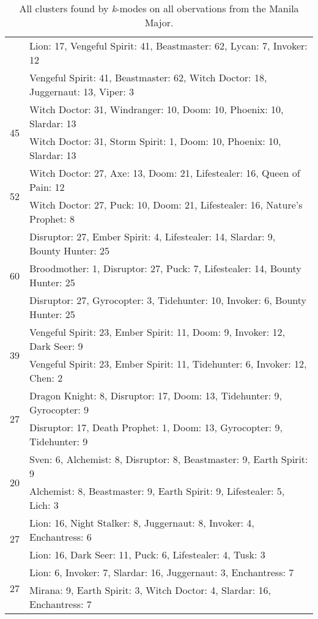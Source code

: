 \documentclass[result.tex]{subfiles}
\begin{document}
\begin{table}[H]
\begin{tabular}{ | c | p{12.5cm} | }
    & Lion: 17, Vengeful Spirit: 41, Beastmaster: 62, Lycan: 7, Invoker: 12 \\
    & Vengeful Spirit: 41, Beastmaster: 62, Witch Doctor: 18, Juggernaut: 13, Viper: 3 \\
    \hline
    \multirow{2}{*}{45}
    & Witch Doctor: 31, Windranger: 10, Doom: 10, Phoenix: 10, Slardar: 13 \\
    & Witch Doctor: 31, Storm Spirit: 1, Doom: 10, Phoenix: 10, Slardar: 13 \\
    \hline
    \multirow{2}{*}{52}
    & Witch Doctor: 27, Axe: 13, Doom: 21, Lifestealer: 16, Queen of Pain: 12 \\
    & Witch Doctor: 27, Puck: 10, Doom: 21, Lifestealer: 16, Nature's Prophet: 8 \\
    \hline
    \multirow{3}{*}{60}
    & Disruptor: 27, Ember Spirit: 4, Lifestealer: 14, Slardar: 9, Bounty Hunter: 25 \\
    & Broodmother: 1, Disruptor: 27, Puck: 7, Lifestealer: 14, Bounty Hunter: 25 \\
    & Disruptor: 27, Gyrocopter: 3, Tidehunter: 10, Invoker: 6, Bounty Hunter: 25 \\
    \hline
    \multirow{2}{*}{39}
    & Vengeful Spirit: 23, Ember Spirit: 11, Doom: 9, Invoker: 12, Dark Seer: 9 \\
    & Vengeful Spirit: 23, Ember Spirit: 11, Tidehunter: 6, Invoker: 12, Chen: 2 \\
    \hline
    \multirow{2}{*}{27}
    & Dragon Knight: 8, Disruptor: 17, Doom: 13, Tidehunter: 9, Gyrocopter: 9 \\
    & Disruptor: 17, Death Prophet: 1, Doom: 13, Gyrocopter: 9, Tidehunter: 9 \\
    \hline
    \multirow{2}{*}{20}
    & Sven: 6, Alchemist: 8, Disruptor: 8, Beastmaster: 9, Earth Spirit: 9 \\
    & Alchemist: 8, Beastmaster: 9, Earth Spirit: 9, Lifestealer: 5, Lich: 3 \\
    \hline
    \multirow{2}{*}{27}
    & Lion: 16, Night Stalker: 8, Juggernaut: 8, Invoker: 4, Enchantress: 6 \\
    & Lion: 16, Dark Seer: 11, Puck: 6, Lifestealer: 4, Tusk: 3 \\
    \hline
    \multirow{2}{*}{27}
    & Lion: 6, Invoker: 7, Slardar: 16, Juggernaut: 3, Enchantress: 7 \\
    & Mirana: 9, Earth Spirit: 3, Witch Doctor: 4, Slardar: 16, Enchantress: 7 \\
    \hline
  \end{tabular}
  \caption{All clusters found by \textit{k}-modes on all obervations from the Manila Major.}
  \label{tab:cl_app_manila_kmodes}
\end{table}
\end{document}
